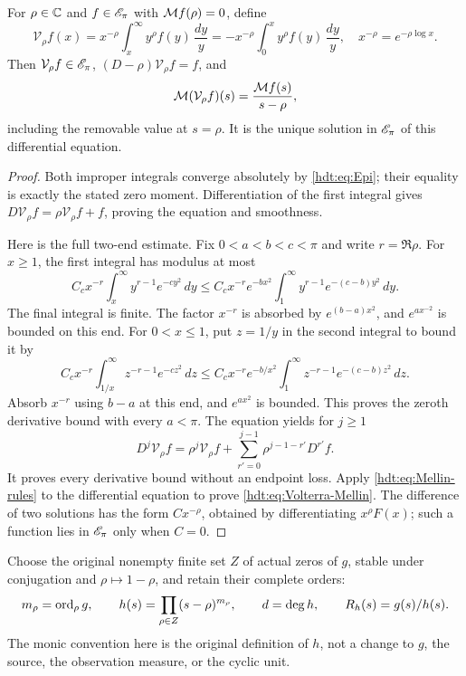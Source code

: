 \begin{hdtlemma}
\label{hdt:lem:volterra}
For $\rho\in\mathbb C$ and $f\in\mathscr E_\pi$ with $\mathcal M f(\rho)=0$, define
\begin{equation}\label{hdt:eq:Volterra}
\mathcal V_\rho f(x)
=x^{-\rho}\int_x^\infty y^\rho f(y)\,\frac{dy}{y}
=-x^{-\rho}\int_0^x y^\rho f(y)\,\frac{dy}{y},
\quad x^{-\rho}=e^{-\rho\log x}.
\end{equation}
Then $\mathcal V_\rho f\in\mathscr E_\pi$,
$(D-\rho)\mathcal V_\rho f=f$, and
\begin{equation}\label{hdt:eq:Volterra-Mellin}
\mathcal M(\mathcal V_\rho f)(s)=\frac{\mathcal M f(s)}{s-\rho},
\end{equation}
including the removable value at $s=\rho$. It is the unique
solution in $\mathscr E_\pi$ of this differential equation.
\end{hdtlemma}
\begin{proof}
Both improper integrals converge absolutely by \eqref{hdt:eq:Epi};
their equality is exactly the stated zero moment. Differentiation
of the first integral gives $D\mathcal V_\rho f=\rho\mathcal
V_\rho f+f$, proving the equation and smoothness.

Here is the full two-end estimate. Fix $0<a<b<c<\pi$ and
write $r=\Re\rho$. For $x\geq1$, the first integral has modulus
at most
\[
C_c x^{-r}\int_x^\infty y^{r-1}e^{-cy^2}\,dy
\leq C_c x^{-r}e^{-bx^2}
\int_1^\infty y^{r-1}e^{-(c-b)y^2}\,dy.
\]
The final integral is finite. The factor $x^{-r}$ is absorbed by
$e^{(b-a)x^2}$, and $e^{ax^{-2}}$ is bounded on this end.
For $0<x\leq1$, put $z=1/y$ in the second integral to bound it by
\[
C_c x^{-r}\int_{1/x}^\infty z^{-r-1}e^{-cz^2}\,dz
\leq C_c x^{-r}e^{-b/x^2}
\int_1^\infty z^{-r-1}e^{-(c-b)z^2}\,dz.
\]
Absorb $x^{-r}$ using $b-a$ at this end, and $e^{ax^2}$ is bounded.
This proves the zeroth derivative bound with every $a<\pi$.
The equation yields for $j\geq1$
\[
D^j\mathcal V_\rho f
=\rho^j\mathcal V_\rho f+
\sum_{r'=0}^{j-1}\rho^{j-1-r'}D^{r'}f.
\]
It proves every derivative bound without an endpoint loss.
Apply \eqref{hdt:eq:Mellin-rules} to the differential equation to prove
\eqref{hdt:eq:Volterra-Mellin}. The difference of two solutions has the
form $Cx^{-\rho}$, obtained by differentiating $x^\rho F(x)$;
such a function lies in $\mathscr E_\pi$ only when $C=0$.
\end{proof}

Choose the original nonempty finite set $Z$ of actual zeros of $g$,
stable under conjugation and $\rho\mapsto1-\rho$, and retain their
complete orders:
\begin{equation}\label{hdt:eq:h}
m_\rho=\operatorname{ord}_\rho g,\qquad
h(s)=\prod_{\rho\in Z}(s-\rho)^{m_\rho},\qquad d=\deg h,
\qquad R_h(s)=g(s)/h(s).
\end{equation}
The monic convention here is the original definition of $h$, not a
change to $g$, the source, the observation measure, or the cyclic unit.

